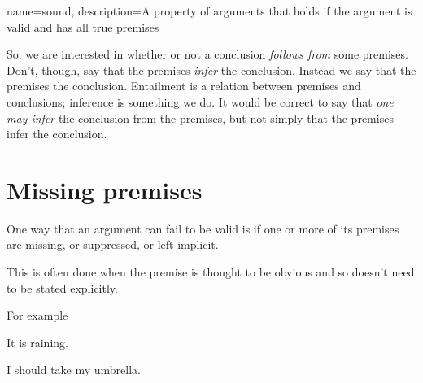 \begin{center}

\end{center}


{
name=sound,
description={A property of arguments that holds if the argument is valid and has all true premises}
}



So: we are interested in whether or not a conclusion \emph{follows from} some premises. 
Don't, though, say that the premises \emph{infer} the conclusion. Instead we say that the premises  the conclusion. 
Entailment is a relation between premises and conclusions; inference is something we do. 
It would be correct to say that \emph{one may infer} the conclusion from the premises, but not simply that the premises infer the conclusion. 


\section{Missing premises}
One way that an argument can fail to be valid is if one
or more of its premises are missing, or suppressed, or
left implicit.

This is often done when the premise is thought to be
obvious and so doesn't need to be stated explicitly.

For example 
\begin{earg}
\item It is raining.
\item[\therefore] I should take my umbrella.
\end{earg}

